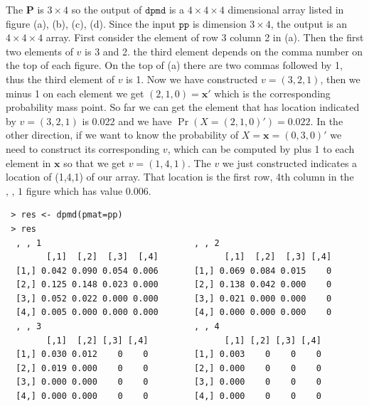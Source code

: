 \documentclass[12pt]{article}
\newcommand{\Pmat}{\mathbf{P}}
\newcommand{\xvec}{\boldsymbol{x}}
\newcommand{\code}{\texttt}
\begin{document}
The $\Pmat$ is $3 \times 4$ so the output of $\code{dpmd}$ is a $4 \times 4 \times 4$ dimensional array listed in figure (a), (b), (c), (d). Since the input $\code{pp}$ is dimension $3 \times 4$, the output is an $4 \times 4 \times 4$ array. First consider the element of row 3 column 2 in (a). Then the first two elements of $v$ is 3 and 2. the third element depends on the comma number on the top of each figure. On the top of (a) there are two commas followed by 1, thus the third element of $v$ is 1. Now we have constructed $v = (3,2,1)$, then we minus 1 on each element we get $(2,1,0)=\xvec'$ which is the corresponding probability mass point. So far we can get the element that has location indicated by $v=(3,2,1)$ is 0.022 and we have $\Pr(X=(2,1,0)')=0.022$. In the other direction, if we want to know the probability of $X=\xvec=(0,3,0)'$ we need to construct its corresponding $v$, which can be computed by plus 1 to each element in $\xvec$ so that we get $v=(1,4,1)$. The $v$ we just constructed indicates a location of (1,4,1) of our array. That location is the first row, 4th column in the $\text{, , 1}$ figure which has value 0.006.

\begin{verbatim}
 > res <- dpmd(pmat=pp)
 > res
  , , 1                              , , 2
        [,1]  [,2]  [,3]  [,4]             [,1]  [,2]  [,3] [,4] 
  [1,] 0.042 0.090 0.054 0.006       [1,] 0.069 0.084 0.015    0 
  [2,] 0.125 0.148 0.023 0.000       [2,] 0.138 0.042 0.000    0 
  [3,] 0.052 0.022 0.000 0.000       [3,] 0.021 0.000 0.000    0 
  [4,] 0.005 0.000 0.000 0.000       [4,] 0.000 0.000 0.000    0 
  , , 3                              , , 4                     
        [,1]  [,2] [,3] [,4]               [,1] [,2] [,3] [,4]
  [1,] 0.030 0.012    0    0         [1,] 0.003    0    0    0 
  [2,] 0.019 0.000    0    0         [2,] 0.000    0    0    0 
  [3,] 0.000 0.000    0    0         [3,] 0.000    0    0    0 
  [4,] 0.000 0.000    0    0         [4,] 0.000    0    0    0 
\end{verbatim}


\end{document}
